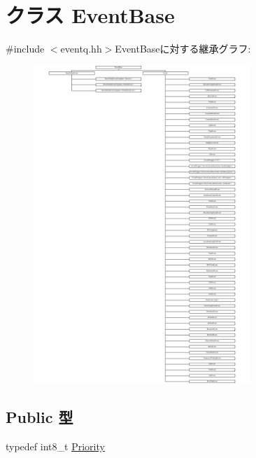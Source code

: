 \hypertarget{classEventBase}{
\section{クラス EventBase}
\label{classEventBase}
}


{\ttfamily \#include $<$eventq.hh$>$}EventBaseに対する継承グラフ:\begin{figure}[H]
\begin{center}
\leavevmode
\includegraphics[height=12cm]{classEventBase}
\end{center}
\end{figure}
\subsection*{Public 型}
\begin{DoxyCompactItemize}
\item 
typedef int8\_\-t \hyperlink{classEventBase_a6d92f7ee8144a5911ed46d85a89a4934}{Priority}
\end{DoxyCompactItemize}
